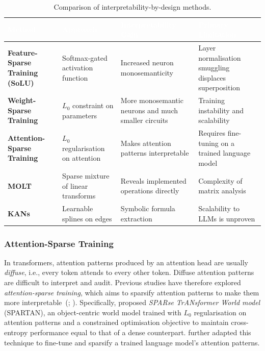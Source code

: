\begin{table}[tb]
\centering
\caption{Comparison of interpretability-by-design methods.}
\label{tab:architectural-methods}
\renewcommand{\arraystretch}{1.3}
\begin{tabular}{>{\raggedright\arraybackslash}p{2.8cm} 
                >{\raggedright\arraybackslash}p{3.2cm} 
                >{\raggedright\arraybackslash}p{4cm} 
                >{\raggedright\arraybackslash}p{4cm}}
\toprule
\rowcolor{tableheader!80} \textcolor{white}{\textbf{Method}} & 
\textcolor{white}{\textbf{Approach}} & 
\textcolor{white}{\textbf{Interpretability Gain}} & 
\textcolor{white}{\textbf{Primary Limitation}} \\
\midrule
\rowcolor{tablerow1} \textbf{Feature-Sparse Training (SoLU)} & Softmax-gated activation function & Increased neuron monosemanticity & Layer normalisation smuggling displaces superposition
\\
\rowcolor{tablerow2} \textbf{Weight-Sparse Training} & $L_0$ constraint on parameters & More monosemantic neurons and much smaller circuits & Training instability and scalability \\
\rowcolor{tablerow1} \textbf{Attention-Sparse Training} & $L_0$ regularisation on attention & Makes attention patterns interpretable & Requires fine-tuning on a trained language model \\

\rowcolor{tablerow2} \textbf{MOLT} & Sparse mixture of linear transforms & Reveals implemented operations directly & Complexity of matrix analysis \\
\rowcolor{tablerow1} \textbf{KANs} & Learnable splines on edges & Symbolic formula extraction & Scalability to LLMs is unproven \\
\bottomrule
\end{tabular}
\end{table}
\subsubsection{Attention-Sparse Training}
\label{subsubsec: spartan}
In transformers, attention patterns produced by an attention head are usually \emph{diffuse}, i.e., every token attends to every other token. Diffuse attention patterns are difficult to interpret and audit. Previous studies have therefore explored \emph{attention-sparse training}, which aims to sparsify attention patterns to make them more interpretable~(; ). Specifically,  proposed \emph{SPARse TrANsformer World model} (SPARTAN), an object-centric world model trained with $L_0$ regularisation on attention patterns and a constrained optimisation objective to maintain cross-entropy performance equal to that of a dense counterpart.  further adapted this technique to fine-tune and sparsify a trained language model's attention patterns.

